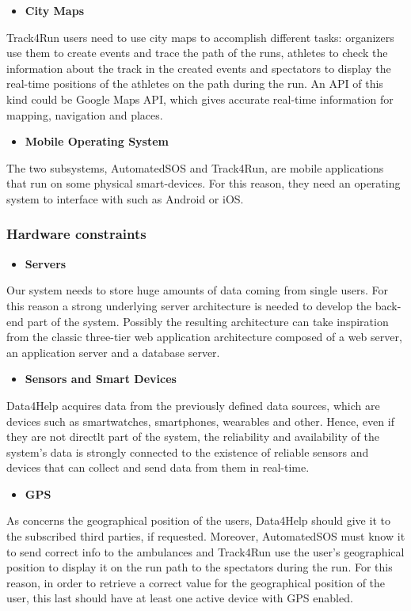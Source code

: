 \begin{itemize}
	\item \textbf{City Maps}
\end{itemize}

Track4Run users need to use city maps to accomplish different tasks: organizers use them to create events and trace the path of the runs, athletes to check the information about the track in the created events and spectators to display the real-time positions of the athletes on the path during the run. An API of this kind could be Google Maps API, which gives accurate real-time information for mapping, navigation and places.

\begin{itemize}
	\item \textbf{Mobile Operating System}
\end{itemize}

The two subsystems, AutomatedSOS and Track4Run, are mobile applications that run on some physical smart-devices. For this reason, they need an operating system to interface with such as Android or iOS.
\subsubsection{Hardware constraints}

\begin{itemize}
	\item \textbf{Servers}
\end{itemize}
Our system needs to store huge amounts of data coming from single users. For this reason a strong underlying server architecture is needed to develop the back-end part of the system. Possibly the resulting architecture can take inspiration from the classic three-tier web application architecture composed of a web server, an application server and a database server.

\begin{itemize}
	\item \textbf{Sensors and Smart Devices}
\end{itemize}
Data4Help acquires data from the previously defined data sources, which are devices such as smartwatches, smartphones, wearables and other. Hence, even if they are not directlt part of the system, the reliability and availability of the system's data is strongly connected to the existence of reliable sensors and devices that can collect and send data from them in real-time.

\begin{itemize}
	\item \textbf{GPS}
\end{itemize}
As concerns the geographical position of the users, Data4Help should give it to the subscribed third parties, if requested. Moreover, AutomatedSOS must know it to send correct info to the ambulances and Track4Run use the user's geographical position to display it on the run path to the spectators during the run. For this reason, in order to retrieve a correct value for the geographical position of the user, this last should have at least one active device with GPS enabled.

